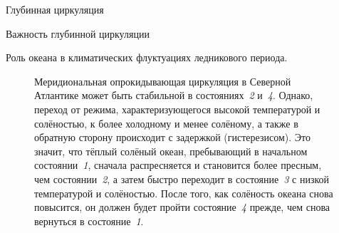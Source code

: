 \begin{chapter}{Глубинная циркуляция}
\begin{section}{Важность глубинной циркуляции}
\begin{paragraph}{Роль океана в климатических флуктуациях ледникового периода.}
\begin{enumerate}
\begin{figure}[b!]
\caption{Меридиональная опрокидывающая 
циркуляция в Северной 
Атлантике может быть стабильной в состояниях~\emph{2} и~\emph{4}. 
Однако, переход от режима, характеризующегося высокой температурой
и солёностью, к более холодному и менее солёному, а также в обратную сторону
происходит с задержкой (гистерезисом). Это значит, что тёплый солёный океан,
пребывающий в начальном состоянии~\emph{1}, сначала распресняется и становится 
более пресным, чем состоянии~\emph{2},  а затем быстро переходит в 
состояние~\emph{3} с низкой температурой и солёностью. После того, 
как солёность океана снова повысится, он должен будет пройти 
состояние~\emph{4} прежде, чем снова вернуться в состояние~\emph{1}.}
\label{fig:hysteresis}
\end{figure}
%


\end{enumerate}
\end{paragraph}
\end{section}
\end{chapter}

